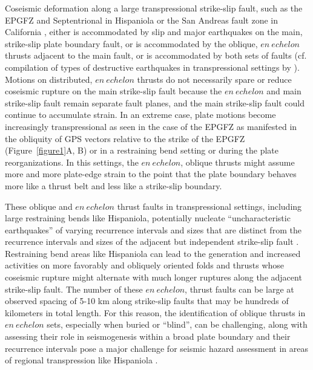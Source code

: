 \documentclass[linenumbers,draft]{agujournal}
\begin{document}
Coseismic deformation along a large transpressional strike-slip fault, such as the EPGFZ and Septentrional \citep{calais2002strain} in Hispaniola or the San Andreas fault zone in California \citep{segall1990surface}, either is accommodated by slip and major earthquakes on the main, strike-slip plate boundary fault, or is accommodated by the oblique, $en~echelon$ thrusts adjacent to the main fault, or is accommodated by both sets of faults (cf. compilation of types of destructive earthquakes in transpressional settings by \citet{hayes2010complex}). Motions on distributed, $en~echelon$ thrusts do not necessarily spare or reduce coseismic rupture on the main strike-slip fault because the $en~echelon$ and main strike-slip fault remain separate fault planes, and the main strike-slip fault could continue to accumulate strain. In an extreme case, plate motions become increasingly transpressional as seen in the case of the EPGFZ as manifested in the obliquity of GPS vectors relative to the strike of the EPGFZ (Figure~\ref{figure1}A, B) or in a restraining bend setting or during the plate reorganizations. In this settings, the $en~echelon$, oblique thrusts might assume more and more plate-edge strain to the point that the plate boundary behaves more like a thrust belt and less like a strike-slip boundary.

These oblique and $en~echelon$ thrust faults in transpressional settings, including large restraining bends like Hispaniola, potentially nucleate ``uncharacteristic earthquakes'' of varying recurrence intervals and sizes that are distinct from the recurrence intervals and sizes of the adjacent but independent strike-slip fault \citep{Fielding2013}. Restraining bend areas like Hispaniola can lead to the generation and increased activities on more favorably and obliquely oriented folds and thrusts whose coseismic rupture might alternate with much longer ruptures along the adjacent strike-slip fault. The number of these $en~echelon$, thrust faults can be large at observed spacing of 5-10 km along strike-slip faults that may be hundreds of kilometers in total length. For this reason, the identification of oblique thrusts in $en~echelon$ sets, especially when buried or ``blind'', can be challenging, along with assessing their role in seismogenesis within a broad plate boundary and their recurrence intervals pose a major challenge for seismic hazard assessment in areas of regional transpression like Hispaniola \citep{frankel2011seismic}.
\end{document}
